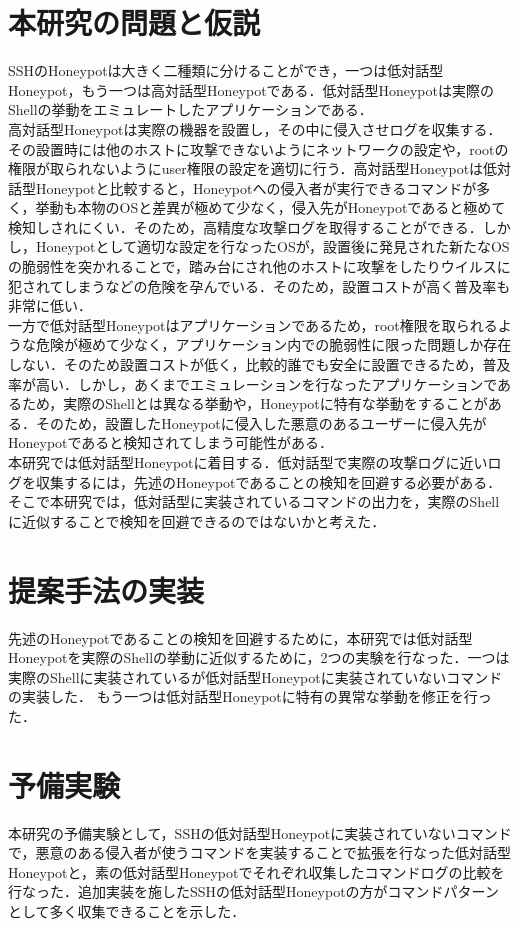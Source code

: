 \section{本研究の問題と仮説}
\label{intr:prob}
SSHのHoneypotは大きく二種類に分けることができ，一つは低対話型Honeypot，もう一つは高対話型Honeypotである．低対話型Honeypotは実際のShellの挙動をエミュレートしたアプリケーションである．\\
高対話型Honeypotは実際の機器を設置し，その中に侵入させログを収集する．その設置時には他のホストに攻撃できないようにネットワークの設定や，rootの権限が取られないようにuser権限の設定を適切に行う．高対話型Honeypotは低対話型Honeypotと比較すると，Honeypotへの侵入者が実行できるコマンドが多く，挙動も本物のOSと差異が極めて少なく，侵入先がHoneypotであると極めて検知しされにくい．そのため，高精度な攻撃ログを取得することができる．しかし，Honeypotとして適切な設定を行なったOSが，設置後に発見された新たなOSの脆弱性を突かれることで，踏み台にされ他のホストに攻撃をしたりウイルスに犯されてしまうなどの危険を孕んでいる．そのため，設置コストが高く普及率も非常に低い．\cite{highinthoney}\\一方で低対話型Honeypotはアプリケーションであるため，root権限を取られるような危険が極めて少なく，アプリケーション内での脆弱性に限った問題しか存在しない．そのため設置コストが低く，比較的誰でも安全に設置できるため，普及率が高い．しかし，あくまでエミュレーションを行なったアプリケーションであるため，実際のShellとは異なる挙動や，Honeypotに特有な挙動をすることがある．そのため，設置したHoneypotに侵入した悪意のあるユーザーに侵入先がHoneypotであると検知されてしまう可能性がある．\\
本研究では低対話型Honeypotに着目する．低対話型で実際の攻撃ログに近いログを収集するには，先述のHoneypotであることの検知を回避する必要がある．そこで本研究では，低対話型に実装されているコマンドの出力を，実際のShellに近似することで検知を回避できるのではないかと考えた．

\section{提案手法の実装}
\label{intr:impl}
先述のHoneypotであることの検知を回避するために，本研究では低対話型Honeypotを実際のShellの挙動に近似するために，2つの実験を行なった．一つは実際のShellに実装されているが低対話型Honeypotに実装されていないコマンドの実装した．
もう一つは低対話型Honeypotに特有の異常な挙動を修正を行った．

\section{予備実験}
\label{intr:prex}
本研究の予備実験として，SSHの低対話型Honeypotに実装されていないコマンドで，悪意のある侵入者が使うコマンドを実装することで拡張を行なった低対話型Honeypotと，素の低対話型Honeypotでそれぞれ収集したコマンドログの比較を行なった．追加実装を施したSSHの低対話型Honeypotの方がコマンドパターンとして多く収集できることを示した．


